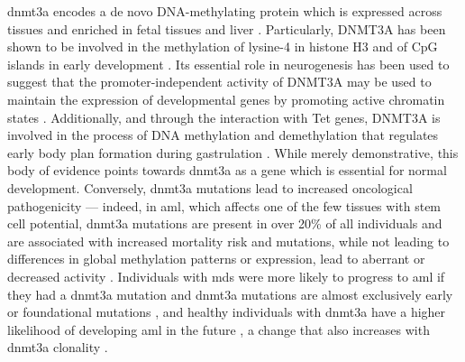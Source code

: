 \Ac{dnmt3a} encodes a de novo DNA-methylating protein \cite{Yanagisawa2002-op} which is expressed across tissues and enriched in fetal tissues and liver \cite{Robertson1999-dp}. Particularly, DNMT3A has been shown to be involved in the methylation of lysine-4 in histone H3 \cite{Ooi2007-pu} and of CpG islands in early development \cite{Smallwood2011-to}. Its essential role in neurogenesis has been used to suggest that the promoter-independent activity of DNMT3A may be used to maintain the expression of developmental genes by promoting active chromatin states \cite{Wu2010-ig}. Additionally, and through the interaction with Tet genes, DNMT3A is involved in the process of DNA methylation and demethylation that regulates early body plan formation during gastrulation \cite{Dai2016-kl}. While merely demonstrative, this body of evidence points towards \ac{dnmt3a} as a gene which is essential for normal development. Conversely, \ac{dnmt3a} mutations lead to increased oncological pathogenicity --- indeed, in \ac{aml}, which affects one of the few tissues with stem cell potential, \ac{dnmt3a} mutations are present in over 20\% of all individuals and are associated with increased mortality risk \cite{Ley2010-yk} and mutations, while not leading to differences in global methylation patterns or expression, lead to aberrant or decreased activity \cite{Yan2011-ug}. Individuals with \ac{mds} were more likely to progress to \ac{aml} if they had a \ac{dnmt3a} mutation \cite{Walter2011-ua} and \ac{dnmt3a} mutations are almost exclusively early or foundational mutations \cite{Shlush2014-di,Miller2013-cw}, and healthy individuals with \ac{dnmt3a} have a higher likelihood of developing \ac{aml} in the future \cite{Gerstung2017-bm,Abelson2018-wh}, a change that also increases with \ac{dnmt3a} clonality \cite{Desai2018-pj}. 

